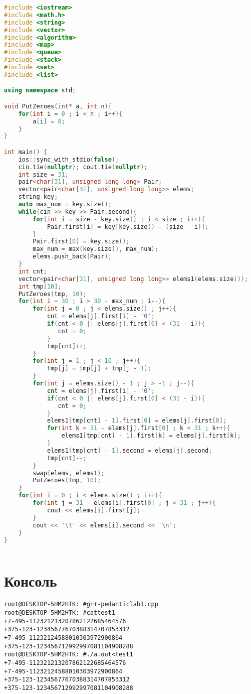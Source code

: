 \begin{lstlisting}[language=C++]
#include <iostream>
#include <math.h>
#include <string>
#include <vector>
#include <algorithm>
#include <map>
#include <queue>
#include <stack>
#include <set>
#include <list>

using namespace std;

void PutZeroes(int* a, int n){
    for(int i = 0 ; i < n ; i++){
        a[i] = 0;
    }
}

int main() {
    ios::sync_with_stdio(false);
    cin.tie(nullptr); cout.tie(nullptr);
    int size = 31;
    pair<char[31], unsigned long long> Pair;
    vector<pair<char[31], unsigned long long>> elems;
    string key;
    auto max_num = key.size();
    while(cin >> key >> Pair.second){
        for(int i = size - key.size() ; i < size ; i++){
            Pair.first[i] = key[key.size() - (size - i)];
        }
        Pair.first[0] = key.size();
        max_num = max(key.size(), max_num);
        elems.push_back(Pair);
    }
    int cnt;
    vector<pair<char[31], unsigned long long>> elems1(elems.size());
    int tmp[10];
    PutZeroes(tmp, 10);
    for(int i = 30 ; i > 30 - max_num ; i--){
        for(int j = 0 ; j < elems.size() ; j++){
            cnt = elems[j].first[i] - '0';
            if(cnt < 0 || elems[j].first[0] < (31 - i)){
               cnt = 0;
            }
            tmp[cnt]++;
        }
        for(int j = 1 ; j < 10 ; j++){
            tmp[j] = tmp[j] + tmp[j - 1];
        }
        for(int j = elems.size() - 1 ; j > -1 ; j--){
            cnt = elems[j].first[i] - '0';
            if(cnt < 0 || elems[j].first[0] < (31 - i)){
               cnt = 0;
            }
            elems1[tmp[cnt] - 1].first[0] = elems[j].first[0];
            for(int k = 31 - elems[j].first[0] ; k < 31 ; k++){
                elems1[tmp[cnt] - 1].first[k] = elems[j].first[k];
            }
            elems1[tmp[cnt] - 1].second = elems[j].second;
            tmp[cnt]--;
        }
        swap(elems, elems1);
        PutZeroes(tmp, 10);
    }
    for(int i = 0 ; i < elems.size() ; i++){
        for(int j = 31 - elems[i].first[0] ; j < 31 ; j++){
            cout << elems[i].first[j];
        }
        cout << '\t' << elems[i].second << '\n';
    }
}
	
\end{lstlisting}

\section{Консоль}
\begin{alltt}
root@DESKTOP-5HM2HTK:~# g++ -pedantic lab1.cpp
root@DESKTOP-5HM2HTK:~# cat test1
+7-495-1123212  13207862122685464576
+375-123-1234567        7670388314707853312
+7-495-1123212  4588010303972900864
+375-123-1234567        12992997081104908288
root@DESKTOP-5HM2HTK:~# ./a.out <test1
+7-495-1123212  13207862122685464576
+7-495-1123212  4588010303972900864
+375-123-1234567        7670388314707853312
+375-123-1234567        12992997081104908288
\end{alltt}
\pagebreak

